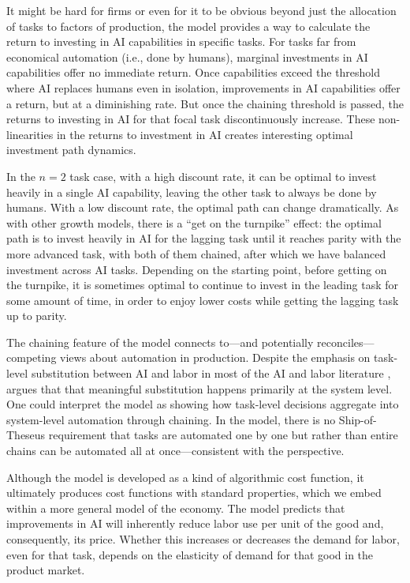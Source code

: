 \documentclass{article}
\theoremstyle{plain}
\theoremstyle{plain}
\begin{document}
It might be hard for firms or even for it to be obvious beyond just the allocation of tasks to factors of production, the model provides a way to calculate the return to investing in AI capabilities in specific tasks.
For tasks far from economical automation (i.e., done by humans), marginal investments in AI capabilities offer no immediate return.
Once capabilities exceed the threshold where AI replaces humans even in isolation, improvements in AI capabilities offer a return, but at a diminishing rate.
But once the chaining threshold is passed, the returns to investing in AI for that focal task discontinuously increase.
These non-linearities in the returns to investment in AI creates interesting optimal investment path dynamics.

In the $n = 2$ task case, with a high discount rate, it can be optimal to invest heavily in a single AI capability, leaving the other task to always be done by humans.
With a low discount rate, the optimal path can change dramatically. 
As with other growth models, there is a ``get on the turnpike'' effect: the optimal path is to invest heavily in AI for the lagging task until it reaches parity with the more advanced task, with both of them chained, after which we have balanced investment across AI tasks.
Depending on the starting point, before getting on the turnpike, it is sometimes optimal to continue to invest in the leading task for some amount of time, in order to enjoy lower costs while getting the lagging task up to parity.

The chaining feature of the model connects to---and potentially reconciles---competing views about automation in production. 
Despite the emphasis on task-level substitution between AI and labor in most of the AI and labor literature \citep{autor2003skill, acemoglu2018automation}, \cite{bresnahan2002information} argues that that meaningful substitution happens primarily at the system level. 
One could interpret the model as showing how task-level decisions aggregate into system-level automation through chaining.
In the model, there is no Ship-of-Theseus requirement that tasks are automated one by one but rather than entire chains can be automated all at once---consistent with the \cite{bresnahan2002information} perspective.

Although the model is developed as a kind of algorithmic cost function, it ultimately produces cost functions with standard properties, which we embed within a more general model of the economy.  
The model predicts that improvements in AI will inherently reduce labor use per unit of the good and, consequently, its price.  
Whether this increases or decreases the demand for labor, even for that task, depends on the elasticity of demand for that good in the product market.  
\end{document}
